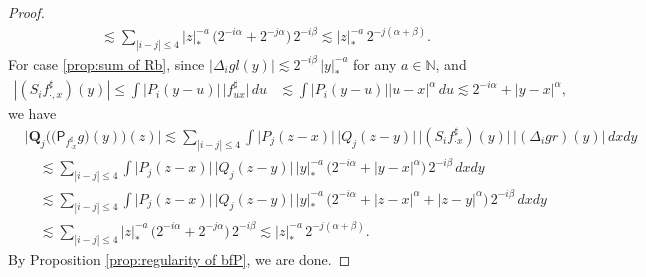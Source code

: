 \documentclass[11pt]{article}
\numberwithin{equation}{section}
\theoremstyle{plain}
\theoremstyle{definition}
\newcommand{\bfQ}{\mathbf{Q}}
\newcommand{\sfP}{\mathsf{P}}
\newcommand{\bbN}{\mathbb{N}}
\begin{document}
\begin{proof}
\begin{align*}
&\lesssim\sum_{|i-j|\le4}|z|_*^{-a} \,\bigl(2^{-i\alpha} + 2^{-j\alpha}\bigr)\,2^{-i\beta} \lesssim |z|_*^{-a}\,2^{-j(\alpha+\beta)}.
\end{align*}
For case \eqref{prop:sum of Rb}, since $\big|\Delta_igl(y)\big| \lesssim 2^{-i\beta}\,|y|_*^{-a}$ for any $a\in\bbN$, and
\begin{align*}
|(S_if_{\cdot,x}^\sharp)(y)|\le
\int \big|P_i(y-u)\big|\,\big|f_{ux}^\sharp\big|\,du &\lesssim\int \big|P_i(y-u)\big| |u-x|^\alpha\,du \lesssim 2^{-i\alpha}+|y-x|^\alpha,
\end{align*}
we have
\begin{align*}
&\Big|\bfQ_j\bigl(\bigl(\sfP_{f_{\cdot x}^\sharp}g\bigr)(y)\bigr)(z)\Big|
\lesssim \sum_{|i-j|\le4} \int \big|P_j(z-x)\big|\, \big|Q_j(z-y)\big| \,\big| (S_if_{\cdot x}^\sharp)(y)\big| \,\big|(\Delta_igr)(y)\big|\,dxdy \\
&\quad\lesssim \sum_{|i-j|\le4} \int \big|P_j(z-x)\big| \,\big|Q_j(z-y)\big| \,|y|_*^{-a} \,\bigl(2^{-i\alpha} + |y-x|^\alpha\bigr)\,2^{-i\beta}\,dxdy\\
&\quad\lesssim \sum_{|i-j|\le4} \int \big|P_j(z-x)\big|\,\big|Q_j(z-y)\big|\, |y|_*^{-a} \,\bigl(2^{-i\alpha} + |z-x|^\alpha+|z-y|^\alpha\bigr)\,2^{-i\beta}\,dxdy \\
&\quad\lesssim \sum_{|i-j|\le4} |z|_*^{-a} \,\bigl(2^{-i\alpha}+2^{-j\alpha}\bigr) \,2^{-i\beta} \lesssim |z|_*^{-a}\,2^{-j(\alpha+\beta)}.
\end{align*}
By Proposition \ref{prop:regularity of bfP}, we are done.
\end{proof}
\end{document}
